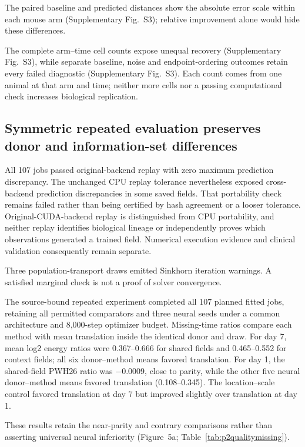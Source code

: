 \documentclass[10pt,a4paper]{article}
\begin{document}
The paired baseline and predicted distances show the absolute error scale within each mouse arm (Supplementary Fig.~S3); relative improvement alone would hide these differences.

The complete arm--time cell counts expose unequal recovery (Supplementary Fig.~S3), while separate baseline, noise and endpoint-ordering outcomes retain every failed diagnostic (Supplementary Fig.~S3). Each count comes from one animal at that arm and time; neither more cells nor a passing computational check increases biological replication.




\subsection{Symmetric repeated evaluation preserves donor and information-set differences}

All 107 jobs passed original-backend replay with zero maximum prediction discrepancy. The unchanged CPU replay tolerance nevertheless exposed cross-backend prediction discrepancies in some saved fields. That portability check remains failed rather than being certified by hash agreement or a looser tolerance. Original-CUDA-backend replay is distinguished from CPU portability, and neither replay identifies biological lineage or independently proves which observations generated a trained field. Numerical execution evidence and clinical validation consequently remain separate.

Three population-transport draws emitted Sinkhorn iteration warnings. A satisfied marginal check is not a proof of solver convergence.

The source-bound repeated experiment completed all 107 planned fitted jobs, retaining all permitted comparators and three neural seeds under a common architecture and 8,000-step optimizer budget. Missing-time ratios compare each method with mean translation inside the identical donor and draw. For day 7, mean log2 energy ratios were 0.367--0.666 for shared fields and 0.465--0.552 for context fields; all six donor--method means favored translation. For day 1, the shared-field PWH26 ratio was $-0.0009$, close to parity, while the other five neural donor--method means favored translation (0.108--0.345). The location--scale control favored translation at day 7 but improved slightly over translation at day 1.

These results retain the near-parity and contrary comparisons rather than asserting universal neural inferiority (Figure~5a\label{call:p2f8}; Table~\ref{tab:p2qualitymissing}).
\end{document}
